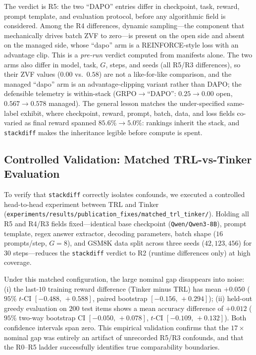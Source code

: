 The verdict is R5: the two ``DAPO'' entries differ in checkpoint, task,
reward, prompt template, and evaluation protocol, before any algorithmic
field is considered. Among the R4 differences, dynamic sampling---the component
that mechanically drives batch ZVF to zero---is present on the open side and
absent on the managed side, whose ``dapo'' arm is a REINFORCE-style loss with
an advantage clip. This is a
\emph{pre-run} verdict computed from manifests alone. The two arms also differ
in model, task, $G$, steps, and seeds (all R5/R3 differences), so their ZVF
values ($0.00$ vs.\ $0.58$) are not a like-for-like comparison, and the
managed ``dapo'' arm is an advantage-clipping variant rather than DAPO; the
defensible telemetry is within-stack (GRPO$\to$``DAPO'': $0.25\to0.00$ open,
$0.567\to0.578$ managed). The general lesson matches the under-specified
same-label exhibit, where checkpoint, reward, prompt, batch, data, and loss
fields co-varied as final reward spanned $85.6\% \to 5.0\%$: rankings
inherit the stack, and \texttt{stackdiff} makes the inheritance legible
before compute is spent.

\subsection{Controlled Validation: Matched TRL-vs-Tinker Evaluation}
\label{sec:p6s-claimc-slot}
To verify that \texttt{stackdiff} correctly isolates confounds, we executed a
controlled head-to-head experiment between TRL and Tinker
(\texttt{experiments/results/publication\_fixes/matched\_trl\_tinker/}).
Holding all R5 and R4/R3 fields fixed---identical base checkpoint (\texttt{Qwen/Qwen3-8B}),
prompt template, regex answer extractor, decoding parameters, batch shape
($16$ prompts/step, $G{=}8$), and GSM8K data split across three seeds ($42, 123, 456$)
for 30 steps---reduces the \texttt{stackdiff} verdict to R2 (runtime differences
only) at high coverage.

Under this matched configuration, the large nominal gap disappears into noise:
(i) the last-$10$ training reward difference (Tinker minus TRL) has mean $+0.050$
($95\%$ $t$-CI $[-0.488,\,+0.588]$, paired bootstrap $[-0.156,\,+0.294]$);
(ii) held-out greedy evaluation on $200$ test items shows a mean accuracy difference
of $+0.012$ ($95\%$ two-way bootstrap CI $[-0.050,\,+0.078]$, $t$-CI $[-0.109,\,+0.132]$).
Both confidence intervals span zero. This empirical validation confirms that the
$17\times$ nominal gap was entirely an artifact of unrecorded R5/R3 confounds,
and that the R0--R5 ladder successfully identifies true comparability boundaries.


